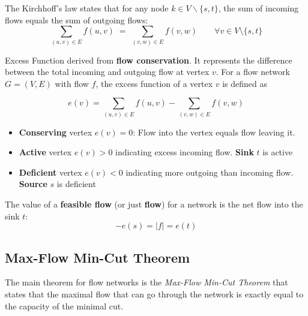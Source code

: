 \documentclass[12pt, openany]{article}
\begin{document}
\begin{definition}
The Kirchhoff's law states that for any node $k \in V \backslash \{s,t\}$, the sum of incoming flows equals the sum of outgoing flows:
\[
    \sum_{(u,v)\in E} f(u,v)
    \;=\;
    \sum_{(v,w)\in E} f(v,w)
    \qquad \forall v \in V \setminus \{s,t\}
    \]
\end{definition}

\begin{definition}
Excess Function derived from \textbf{flow conservation}. It represents the difference between the total incoming and outgoing flow at vertex \(v\). For a flow network \(G = (V,E)\) with flow \(f\), the excess function of a vertex \(v\) is defined as

\[
e(v) =
\sum_{(u,v)\in E} f(u,v)
-
\sum_{(v,w)\in E} f(v,w)
\]
\end{definition}





\begin{itemize}

\item \textbf{Conserving} vertex \(e(v) = 0\): Flow into the vertex equals flow leaving it.
\item \textbf{Active} vertex \(e(v) > 0\) indicating excess incoming flow. \textbf{Sink} \(t\) is active
\item \textbf{Deficient} vertex \(e(v) < 0\) indicating more outgoing than incoming flow. \textbf{Source} \(s\) is deficient


\end{itemize}
The value of a \textbf{feasible flow} (or just \textbf{flow}) for a network is the net flow into the sink \(t\):
\[
-e(s) = |f| = e(t)
\]


\subsection{Max-Flow Min-Cut Theorem}

The main theorem for flow networks is the \emph{Max-Flow Min-Cut Theorem} that states that the maximal flow that can go through the network is exactly equal to the capacity of the minimal cut.
\end{document}
